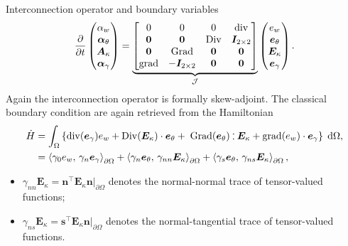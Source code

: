 \documentclass[aspectratio=169]{ISAE-Beamer}
\DeclareMathOperator*{\grad}{grad}
\DeclareMathOperator*{\Grad}{Grad}
\DeclareMathOperator*{\Div}{Div}
\renewcommand{\div}{\operatorname{div}}
\newcommand{\inner}[3][]{\ensuremath{\left\langle #2, \, #3 \right\rangle_{#1}}}
\def\onedot{$\mathsurround0pt\ldotp$}
\def\cddot{%
	\mathbin{\vcenter{\baselineskip.67ex
			\hbox{\onedot}\hbox{\onedot}}%
}}
\begin{document}
\begin{frame}{Interconnection operator and boundary variables}
\begin{equation*}\label{eq:pHdyn_Min}
\diffp{}{t}
\begin{pmatrix}
\alpha_w \\
\bm\alpha_\theta \\
\bm{A}_\kappa \\
\bm\alpha_{\gamma} \\
\end{pmatrix} = 
\underbrace{\begin{bmatrix}
0  & 0  & 0  & \div \\
\bm{0} & \bm{0} &  \Div & \bm{I}_{2 \times 2}\\
\bm{0}  & \Grad  & \bm{0}  & \bm{0}\\
\grad & -\bm{I}_{2 \times 2} &  \bm{0} & \bm{0} \\
\end{bmatrix}}_{\mathcal{J}}
\begin{pmatrix}
e_w \\
\bm{e}_{\theta} \\
\bm{E}_{\kappa} \\
\bm{e}_{\gamma} \\
\end{pmatrix}.
\end{equation*}
Again the interconnection operator is formally skew-adjoint. The classical boundary condition are again retrieved from the Hamiltonian
\begin{equation*}
\begin{aligned}
\dot{H}&= \int_{\Omega} \left\{ \div(\bm{e}_{\gamma}) e_w  + \Div(\bm{E}_{\kappa}) \cdot \bm{e}_\theta + \; \Grad(\bm{e}_{\theta}) \cddot \bm{E}_{\kappa}  + \grad (e_w) \cdot \bm{e}_{\gamma} \right\} \d\Omega, \\
&= \inner[\partial\Omega]{\gamma_{0} e_w}{\gamma_{n} \bm{e}_\gamma} + \inner[\partial\Omega]{\gamma_{n}\bm{e}_\theta}{\gamma_{nn}\bm{E}_\kappa} + \inner[\partial\Omega]{\gamma_{s}\bm{e}_\theta}{\gamma_{ns}\bm{E}_\kappa},  \\
\end{aligned}
\end{equation*}
\begin{itemize}
\item $\gamma_{nn}\bm{E}_\kappa = \bm{n}^\top \bm{E}_\kappa \bm{n}\vert_{\partial\Omega}$ denotes the normal-normal trace  of tensor-valued functions;
\item $\gamma_{ns}\bm{E}_\kappa = \bm{s}^\top \bm{E}_\kappa \bm{n}\vert_{\partial\Omega}$ denotes the normal-tangential trace of tensor-valued functions.
\end{itemize}
\end{frame}
\end{document}
